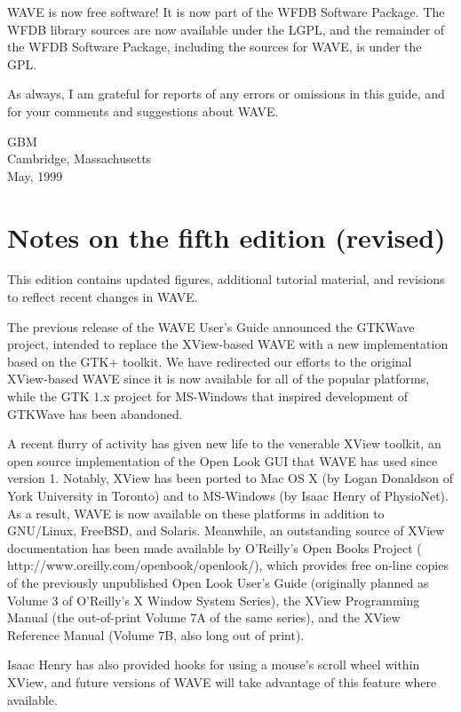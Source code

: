 \documentclass[twoside]{book}
\newcommand{\WAVE}{{\sf WAVE}\xspace}
\begin{document}
\WAVE{} is now free software!  It is now part of the WFDB Software
Package.  The WFDB library sources are now available under the LGPL,
and the remainder of the WFDB Software Package, including the sources
for \WAVE{}, is under the GPL.

As always, I am grateful for reports of any errors or omissions in this
guide, and for your comments and suggestions about \WAVE{}.

\vspace{2em}
\noindent
GBM\\
Cambridge, Massachusetts\\
May, 1999

\vfill

\section*{Notes on the fifth edition (revised)}

This edition contains updated figures, additional tutorial material,
and revisions to reflect recent changes in \WAVE{}.

The previous release of the \WAVE{} User's Guide announced the GTKWave
project, intended to replace the XView-based \WAVE{} with a new
implementation based on the GTK+ toolkit.  We have redirected our
efforts to the original XView-based \WAVE{} since it is now
available for all of the popular platforms, while the GTK 1.x project
for MS-Windows that inspired development of GTKWave has been
abandoned.

A recent flurry of activity has given new life to the venerable
XView toolkit, an open source implementation of the Open Look GUI
that \WAVE{} has used since version 1.  Notably, XView has been ported
to Mac OS X (by Logan Donaldson of York University in Toronto) and to
MS-Windows (by Isaac Henry of PhysioNet).  As a result, \WAVE{} is now
available on these platforms in addition to GNU/Linux, FreeBSD,
and Solaris.  Meanwhile, an outstanding source of XView documentation
has been made available by O'Reilly's Open Books Project
(
{http://www.oreilly.com/openbook/openlook/}), which provides free
on-line copies of the previously unpublished Open Look User's Guide (originally
planned as Volume 3 of O'Reilly's X Window System Series), the XView
Programming Manual (the out-of-print Volume 7A of the same series),
and the XView Reference Manual (Volume 7B, also long out of print).

Isaac Henry has also provided hooks for using a mouse's scroll wheel
within XView, and future versions of \WAVE{} will take advantage of
this feature where available.
\end{document}
